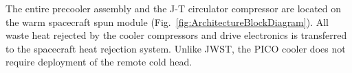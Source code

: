 The entire precooler assembly and the J-T circulator compressor are located on the warm spacecraft spun module (Fig.~\ref{fig:ArchitectureBlockDiagram}). 
All waste heat rejected by the cooler compressors and drive electronics is transferred to the spacecraft heat rejection system. Unlike JWST, the PICO cooler does not require deployment of the remote cold head.



